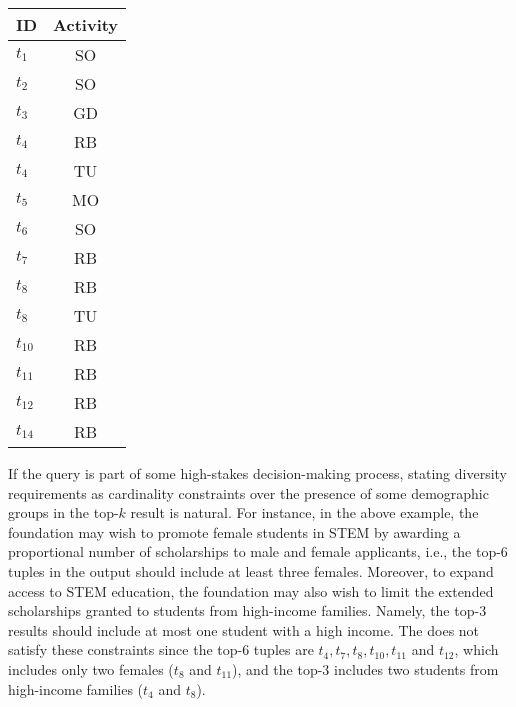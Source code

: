 \begin{table}[t]
\begin{center}
\begin{minipage}{.35\linewidth}
\begin{tabular}{lc}
    \textbf{ID} & \textbf{Activity} \\ \hline
        $t_{1}$            & SO        \\  
        $t_{2}$            & SO        \\  
        $t_{3}$            & GD        \\  
        $t_{4}$            & RB        \\
        $t_{4}$            & TU        \\
        $t_{5}$            & MO        \\  
        $t_{6}$            & SO        \\  
        $t_{7}$            & RB        \\  
        $t_{8}$          & RB        \\
        $t_{8}$           & TU        \\
        $t_{10}$           & RB        \\  
        $t_{11}$           & RB        \\  
        $t_{12}$           & RB        \\
        $t_{14}$          & RB        \\
        \hline
    \end{tabular}
\end{minipage}
\end{center}
\end{table}




If the query is part of some high-stakes decision-making process, stating diversity requirements as cardinality constraints over the presence of some demographic groups in the top-$k$ result is natural. For instance, in the above example, the foundation may wish to promote female students in STEM by awarding a proportional number of scholarships to male and female applicants, i.e., the top-$6$ tuples in the output should include at least three females. Moreover, to expand access to STEM education, the foundation may also wish to limit the extended scholarships granted to students from high-income families. Namely, the top-$3$ results should include at most one student with a high income. The \running{} does not satisfy these constraints since the top-$6$ tuples are $t_4, t_7, t_8, t_{10}, t_{11}$ and $t_{12}$, which includes only two females ($t_8$ and $t_{11}$), and the top-$3$ includes two students from high-income families ($t_4$ and $t_{8}$). 







